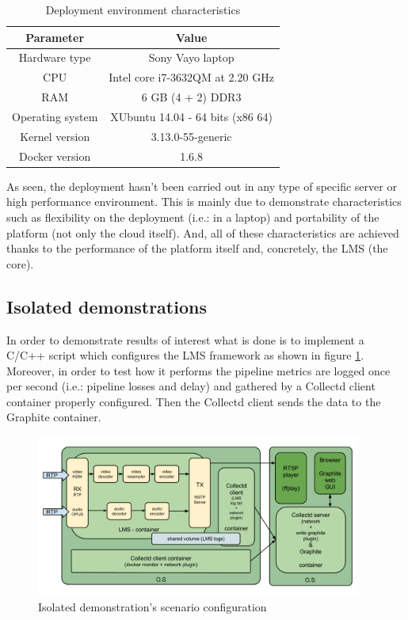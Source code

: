 \begin{table}[htb]
\caption{Deployment environment characteristics}
\begin{center}
\begin{tabular}{|c|c|}
\hline
{\bf Parameter} & {\bf Value} \\ \hline \hline
Hardware type        & Sony Vayo laptop \\ \hline
CPU        & Intel core i7-3632QM at 2.20 GHz  \\ \hline
RAM        & 6 GB (4 + 2) DDR3 \\ \hline
Operating system        & XUbuntu 14.04 - 64 bits (x86 64)  \\ \hline
Kernel version        & 3.13.0-55-generic  \\ \hline
Docker version        & 1.6.8  \\ \hline
\end{tabular}
\label{T:dec}
\end{center}
\end{table}

As seen, the deployment hasn't been carried out in any type of specific server or high performance environment. This is mainly due to demonstrate characteristics such as flexibility on the deployment (i.e.: in a laptop) and portability of the platform (not only the cloud itself). And, all of these characteristics are achieved thanks to the performance of the platform itself and, concretely, the LMS (the core).

\subsection{Isolated demonstrations}

In order to demonstrate results of interest what is done is to implement a C/C++ script which configures the LMS framework as shown in figure \ref{F:idsc}. Moreover, in order to test how it performs the pipeline metrics are logged once per second (i.e.: pipeline losses and delay) and gathered by a Collectd client container properly configured. Then the Collectd client sends the data to the Graphite container. 

\begin{figure}[htb]
\begin{center}
\includegraphics[width=0.95\textwidth]{./images/isolatedScenario.png}
\caption{Isolated demonstration's scenario configuration}
\label{F:idsc}
\end{center}
\end{figure}

